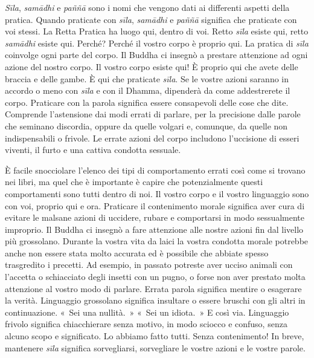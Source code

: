 \emph{Sīla}, \emph{samādhi} e \emph{paññā} sono i nomi che vengono dati
ai differenti aspetti della pratica. Quando praticate con \emph{sīla},
\emph{samādhi} e \emph{paññā} significa che praticate con voi stessi. La
Retta Pratica ha luogo qui, dentro di voi. Retto \emph{sīla} esiste qui,
retto \emph{samādhi} esiste qui. Perché? Perché il vostro corpo è
proprio qui. La pratica di \emph{sīla} coinvolge ogni parte del corpo.
Il Buddha ci insegnò a prestare attenzione ad ogni azione del nostro
corpo. Il vostro corpo esiste qui! È proprio qui che avete delle braccia
e delle gambe. È qui che praticate \emph{sīla}. Se le vostre azioni
saranno in accordo o meno con \emph{sīla} e con il Dhamma, dipenderà da
come addestrerete il corpo. Praticare con la parola significa essere
consapevoli delle cose che dite. Comprende l'astensione dai modi errati
di parlare, per la precisione dalle parole che seminano discordia,
oppure da quelle volgari e, comunque, da quelle non indispensabili o
frivole. Le errate azioni del corpo includono l'uccisione di esseri
viventi, il furto e una cattiva condotta sessuale.

È facile snocciolare l'elenco dei tipi di comportamento errati così come
si trovano nei libri, ma quel che è importante è capire che
potenzialmente questi comportamenti sono tutti dentro di noi. Il vostro
corpo e il vostro linguaggio sono con voi, proprio qui e ora. Praticare
il contenimento morale significa aver cura di evitare le malsane azioni
di uccidere, rubare e comportarsi in modo sessualmente improprio. Il
Buddha ci insegnò a fare attenzione alle nostre azioni fin dal livello
più grossolano. Durante la vostra vita da laici la vostra condotta
morale potrebbe anche non essere stata molto accurata ed è possibile che
abbiate spesso trasgredito i precetti. Ad esempio, in passato potreste
aver ucciso animali con l'accetta o schiacciato degli insetti con un
pugno, o forse non aver prestato molta attenzione al vostro modo di
parlare. Errata parola significa mentire o esagerare la verità.
Linguaggio grossolano significa insultare o essere bruschi con gli altri
in continuazione. «~Sei una nullità.~» «~Sei un idiota.~» E così via.
Linguaggio frivolo significa chiacchierare senza motivo, in modo sciocco
e confuso, senza alcuno scopo e significato. Lo abbiamo fatto tutti.
Senza contenimento! In breve, mantenere \emph{sīla} significa
sorvegliarsi, sorvegliare le vostre azioni e le vostre parole.

